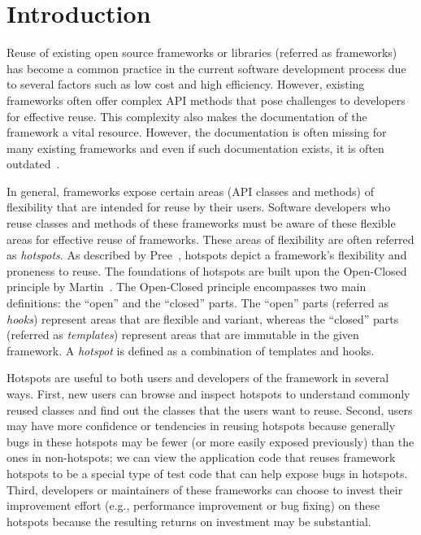 \documentclass[conference]{IEEEtran}
\newcommand{\Intro}[1]{\emph{#1}}
\begin{document}
\section {Introduction}

Reuse of existing open source frameworks or libraries (referred as frameworks)
has become a common practice in the
current software development process due to several factors such as low
cost and high efficiency. However, existing frameworks often offer
complex API methods that pose challenges to developers for effective reuse.
This complexity also makes the documentation of the framework a
vital resource. However, the documentation is often missing for many
existing frameworks and even if such documentation exists, it
is often outdated~\cite{document:leth}.

In general, frameworks expose certain areas (API classes and methods) of
flexibility that are intended for reuse by their users. Software
developers who reuse classes and methods of these frameworks must be aware of
these flexible areas for effective reuse of frameworks. These
areas of flexibility are often referred as \Intro{hotspots}.
As described by Pree~\cite{pree:metapatterns}, hotspots depict a framework's
flexibility and proneness to reuse. The foundations of hotspots are
built upon the Open-Closed principle by Martin~\cite{martin:open}.
The Open-Closed principle encompasses two main definitions: the
``open'' and the ``closed'' parts. The ``open'' parts (referred as \Intro{hooks}) represent
areas that are flexible and variant, whereas the ``closed'' parts (referred as \Intro{templates}) 
represent areas that are immutable in the given framework. 
A \Intro{hotspot} is defined as a combination of templates and hooks.

Hotspots are useful to both users and developers of the framework
in several ways. First, new users can browse and inspect hotspots to understand commonly
reused classes and find out the classes that the users want to reuse.
Second, users may have more confidence or tendencies in
reusing hotspots because generally bugs in these hotspots may be
fewer (or more easily exposed previously) than the ones in
non-hotspots; we can view the application code that reuses framework hotspots to be a special
type of test code that can help expose bugs in
hotspots. Third, developers or maintainers of these frameworks can choose to
invest their improvement effort (e.g., performance improvement or bug fixing) 
on these hotspots because the resulting returns on
investment may be substantial.
\end{document}
